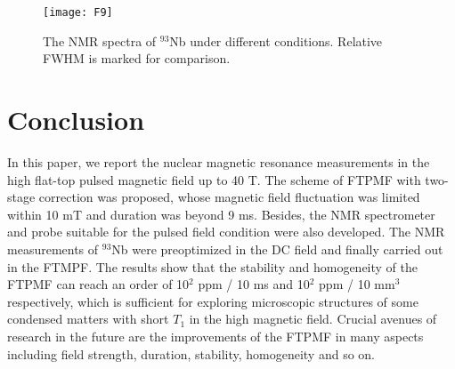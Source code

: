 \documentclass[lettersize,journal]{IEEEtran}
\begin{document}
\begin{figure}[!t]
\centering
\texttt{[image: F9]}
\caption{The NMR spectra of $^{93}$Nb under different conditions. Relative FWHM is marked for comparison.}
\end{figure}

\section{Conclusion}
In this paper, we report the nuclear magnetic resonance measurements in the high flat-top pulsed magnetic field up to 40 T. The scheme of FTPMF with two-stage correction was proposed, whose magnetic field fluctuation was limited within 10 mT and duration was beyond 9 ms. Besides, the NMR spectrometer and probe suitable for the pulsed field condition were also developed. The NMR measurements of $^{93}$Nb were preoptimized in the DC field and finally carried out in the FTMPF. The results show that the stability and homogeneity of the FTPMF can reach an order of  10$^2$ ppm / 10 ms and 10$^2$ ppm / 10 mm$^3$ respectively, which is sufficient for exploring microscopic structures of some condensed matters with short $T_1$ in the high magnetic field. Crucial avenues of research in the future are the improvements of the FTPMF in many aspects including field strength, duration, stability, homogeneity and so on.


\normalem

\end{document}
